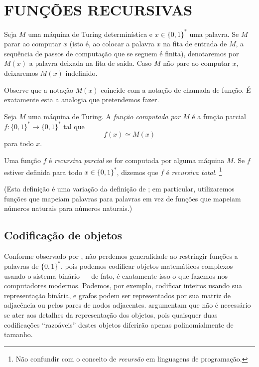 \section{FUNÇÕES RECURSIVAS}

\begin{notation}
    Seja $M$ uma máquina de Turing determinística
    e $x \in \{0, 1\}^*$ uma palavra.
    Se $M$ parar ao computar $x$
    (isto é,
    ao colocar a palavra $x$ na fita de entrada de $M$,
    a sequência de passos de computação que se seguem é finita),
    denotaremos por $M(x)$ a palavra deixada na fita de saída.
    Caso $M$ não pare ao computar $x$,
    deixaremos $M(x)$ indefinido.
\end{notation}

Observe que a notação $M(x)$ coincide com a notação de chamada de função.
É exatamente esta a analogia que pretendemos fazer.

\begin{definition}
    \label{def:recursive_function}
    Seja $M$ uma máquina de Turing.
    A \emph{função computada por $M$}
    é a função parcial $f: \{0, 1\}^* \to \{0, 1\}^*$ tal que
    \begin{equation*}
        f(x) \simeq M(x)
    \end{equation*}
    para todo $x$.

    Uma função $f$ é \emph{recursiva parcial}
    se for computada por alguma máquina $M$.
    Se $f$ estiver definida para todo $x \in \{0, 1\}^*$,
    dizemos que $f$ é \emph{recursiva total}.
    \footnote{
        Não confundir com o conceito de \emph{recursão} em linguagens de programação.
    }
\end{definition}
(Esta definição é uma variação da definição de ;
em particular, utilizaremos funções que mapeiam palavras para palavras
em vez de funções que mapeiam números naturais para números naturais.)

\subsection{Codificação de objetos}
\label{sec:binary_encoding}

Conforme observado por ,
não perdemos generalidade ao restringir funções a palavras de $\{0, 1\}^*$,
pois podemos codificar objetos matemáticos complexos usando o sistema binário
--- de fato,
é exatamente isso o que fazemos nos computadores modernos.
Podemos, por exemplo,
codificar inteiros usando sua representação binária,
e grafos podem ser representados por sua matriz de adjacência
ou pelos pares de nodos adjacentes.
 argumentam que
não é necessário se ater aos detalhes da representação dos objetos,
pois quaisquer duas codificações ``razoáveis'' destes objetos
diferirão apenas polinomialmente de tamanho.

